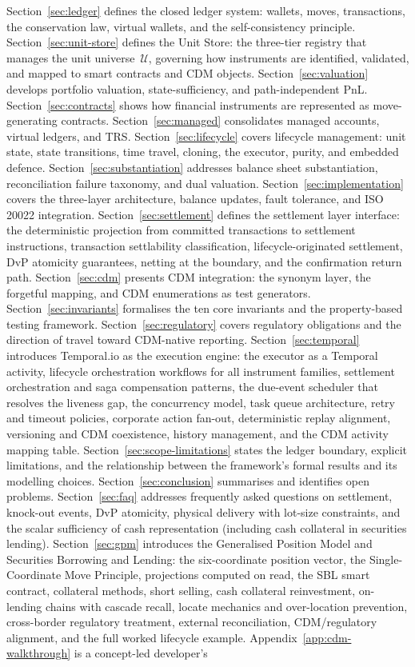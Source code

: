 \documentclass[11pt,a4paper]{article}
\begin{document}
Section~\ref{sec:ledger} defines the closed ledger system: wallets, moves, transactions, the conservation law, virtual wallets, and the self-consistency principle. Section~\ref{sec:unit-store} defines the Unit Store: the three-tier registry that manages the unit universe~$\mathcal{U}$, governing how instruments are identified, validated, and mapped to smart contracts and CDM objects. Section~\ref{sec:valuation} develops portfolio valuation, state-sufficiency, and path-independent PnL. Section~\ref{sec:contracts} shows how financial instruments are represented as move-generating contracts. Section~\ref{sec:managed} consolidates managed accounts, virtual ledgers, and TRS. Section~\ref{sec:lifecycle} covers lifecycle management: unit state, state transitions, time travel, cloning, the executor, purity, and embedded defence. Section~\ref{sec:substantiation} addresses balance sheet substantiation, reconciliation failure taxonomy, and dual valuation. Section~\ref{sec:implementation} covers the three-layer architecture, balance updates, fault tolerance, and ISO 20022 integration. Section~\ref{sec:settlement} defines the settlement layer interface: the deterministic projection from committed transactions to settlement instructions, transaction settlability classification, lifecycle-originated settlement, DvP atomicity guarantees, netting at the boundary, and the confirmation return path. Section~\ref{sec:cdm} presents CDM integration: the synonym layer, the forgetful mapping, and CDM enumerations as test generators. Section~\ref{sec:invariants} formalises the ten core invariants and the property-based testing framework. Section~\ref{sec:regulatory} covers regulatory obligations and the direction of travel toward CDM-native reporting. Section~\ref{sec:temporal} introduces Temporal.io as the execution engine: the executor as a Temporal activity, lifecycle orchestration workflows for all instrument families, settlement orchestration and saga compensation patterns, the due-event scheduler that resolves the liveness gap, the concurrency model, task queue architecture, retry and timeout policies, corporate action fan-out, deterministic replay alignment, versioning and CDM coexistence, history management, and the CDM activity mapping table. Section~\ref{sec:scope-limitations} states the ledger boundary, explicit limitations, and the relationship between the framework's formal results and its modelling choices. Section~\ref{sec:conclusion} summarises and identifies open problems. Section~\ref{sec:faq} addresses frequently asked questions on settlement, knock-out events, DvP atomicity, physical delivery with lot-size constraints, and the scalar sufficiency of cash representation (including cash collateral in securities lending). Section~\ref{sec:gpm} introduces the Generalised Position Model and Securities Borrowing and Lending: the six-coordinate position vector, the Single-Coordinate Move Principle, projections computed on read, the SBL smart contract, collateral methods, short selling, cash collateral reinvestment, on-lending chains with cascade recall, locate mechanics and over-location prevention, cross-border regulatory treatment, external reconciliation, CDM/regulatory alignment, and the full worked lifecycle example. Appendix~\ref{app:cdm-walkthrough} is a concept-led developer's 
\end{document}
